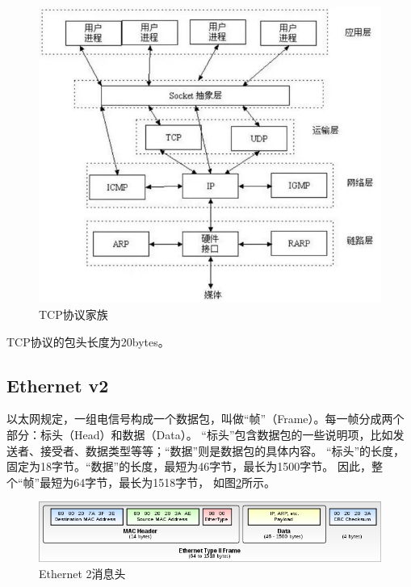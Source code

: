 \documentclass{book}
\begin{document}
\begin{figure}[htbp]
	\centering
	\includegraphics[scale=0.5]{TCPCommunicationBundle.jpg}
	\caption{TCP协议家族}
	\label{fig:TCPCommunicationBundle}
\end{figure}

TCP协议的包头长度为20bytes。

\subsection{Ethernet v2}

以太网规定，一组电信号构成一个数据包，叫做“帧”（Frame）。每一帧分成两个部分：标头（Head）和数据（Data）。
“标头”包含数据包的一些说明项，比如发送者、接受者、数据类型等等；“数据”则是数据包的具体内容。
“标头”的长度，固定为18字节。“数据”的长度，最短为46字节，最长为1500字节。
因此，整个“帧”最短为64字节，最长为1518字节，
如图\ref{fig:700px-Ethernet_Type_II_Frame_format.svg}所示。

\begin{figure}[htbp]
	\centering
	\includegraphics[scale=0.5]{700px-Ethernet_Type_II_Frame_format.svg.png}
	\caption{Ethernet 2消息头}
	\label{fig:700px-Ethernet_Type_II_Frame_format.svg}
\end{figure}
\end{document}
